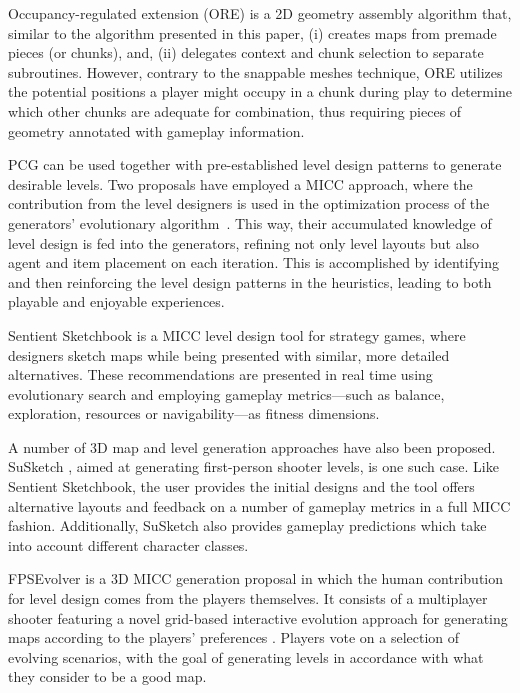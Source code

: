 \documentclass[journal]{IEEEtran}
\begin{document}
Occupancy-regulated extension (ORE) \cite{mawhorter2010ore} is a 2D geometry assembly algorithm
that, similar to the algorithm presented in this paper, (i) creates maps from premade pieces (or
chunks), and, (ii) delegates context and chunk selection to separate subroutines. However,
contrary to the snappable meshes technique, ORE utilizes the potential positions a player might
occupy in a chunk during play to determine which other chunks are adequate for combination, thus
requiring pieces of geometry annotated with gameplay information.

PCG can be used together with pre-established level design patterns to generate desirable
levels. Two proposals have employed a MICC approach, where the contribution from the level
designers is used in the optimization process of the generators' evolutionary
algorithm~\cite{baldwin2017mixed,walton2020mixed}. This way, their accumulated knowledge of
level design is fed into the generators, refining not only level layouts but also agent and
item placement on each iteration. This is accomplished by identifying and then reinforcing
the level design patterns in the heuristics, leading to both playable and enjoyable
experiences.

Sentient Sketchbook \cite{liapis2013sentient} is a MICC level design tool for strategy games,
where designers sketch maps while being presented with similar, more detailed alternatives.
These recommendations are presented in real time using evolutionary search and employing gameplay
metrics---such as balance, exploration, resources or navigability---as fitness dimensions.

A number of 3D map and level generation approaches have also been proposed. SuSketch
\cite{migkotzidis2021susketch}, aimed at generating first-person shooter levels, is one such case.
Like Sentient Sketchbook, the user provides the initial designs and the tool offers alternative
layouts and feedback on a number of gameplay metrics in a full MICC fashion. Additionally, SuSketch
also provides gameplay predictions which take into account different character classes.

FPSEvolver is a 3D MICC generation proposal in which the human contribution for level design
comes from the players themselves. It consists of a multiplayer shooter featuring a novel
grid-based interactive evolution approach for generating maps according to the players'
preferences \cite{olsted2015interactive}. Players vote on a selection of evolving scenarios,
with the goal of generating levels in accordance with what they consider to be a good map.
\end{document}
